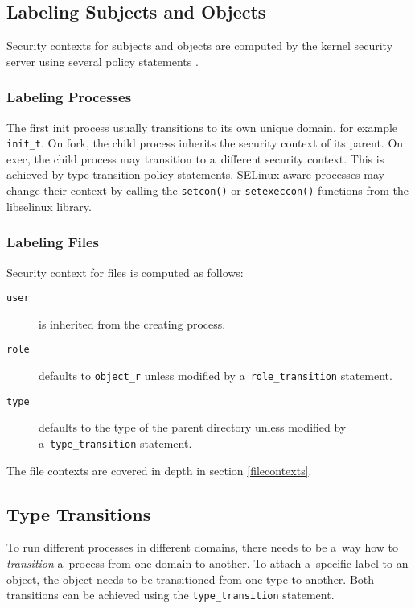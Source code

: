 \subsection{Labeling Subjects and Objects}
Security contexts for subjects and objects are computed by the kernel security
server using several policy statements \cite[pp.~31--33]{tsn}.

\subsubsection{Labeling Processes}
The first init process usually transitions to its own unique domain, for example
\texttt{init\_t}. On fork, the child process inherits the security context of
its parent. On exec, the child process may transition to a~different security
context. This is achieved by type transition policy statements. SELinux-aware
processes may change their context by calling the \texttt{setcon()} or
\texttt{setexeccon()} functions from the libselinux library.

\subsubsection{Labeling Files}
Security context for files is computed as follows:
\begin{description}
    \item [\texttt{user}] is inherited from the creating process.
    \item [\texttt{role}] defaults to \texttt{object\_r} unless modified by
        a~\texttt{role\_transition} statement.
    \item [\texttt{type}] defaults to the type of the parent directory unless
        modified by a~\texttt{type\_transition} statement.
\end{description}
The file contexts are covered in depth in section \ref{filecontexts}.

\subsection{Type Transitions}
\label{typetransitions}
To run different processes in different domains, there needs to be a~way how to
\emph{transition} a~process from one domain to another. To attach a~specific
label to an object, the object needs to be transitioned from one type to
another. Both transitions can be achieved using the \texttt{type\_transition}
statement.

